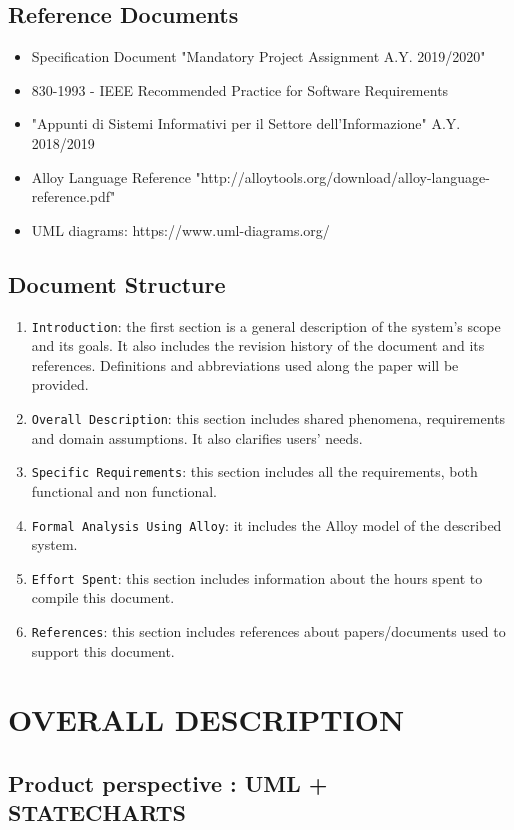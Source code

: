\documentclass[12pt,a4paper]{article}
\begin{document}
\subsection{Reference	Documents} 
\begin{itemize}
				\item Specification Document "Mandatory Project Assignment A.Y. 2019/2020"
				\item 830-1993 - IEEE Recommended Practice for Software Requirements
				\item "Appunti di Sistemi Informativi per il Settore dell'Informazione" A.Y. 2018/2019
				\item Alloy Language Reference "http://alloytools.org/download/alloy-language-reference.pdf"
				\item UML diagrams: https://www.uml-­diagrams.org/
			\end{itemize}
\subsection{Document	Structure} 
\begin{enumerate}
			\item \texttt{Introduction}: the first section is a general description of the system's scope and its goals. It also includes the revision history of the document and its references. Definitions and abbreviations used along the paper will be provided.
			\item \texttt{Overall Description}: this section includes shared phenomena, requirements and domain assumptions. It also clarifies users' needs.
			\item \texttt{Specific Requirements}: this section includes all the requirements, both functional and non functional.
			\item \texttt{Formal Analysis Using Alloy}: it includes the Alloy model of the described system.
			\item \texttt{Effort Spent}: this section includes information about the hours spent to compile this document.
			\item \texttt{References}: this section includes references about papers/documents used to support this document.
		\end{enumerate}
\section{OVERALL	DESCRIPTION}
\subsection{Product	perspective : UML + STATECHARTS} 
\end{document}
